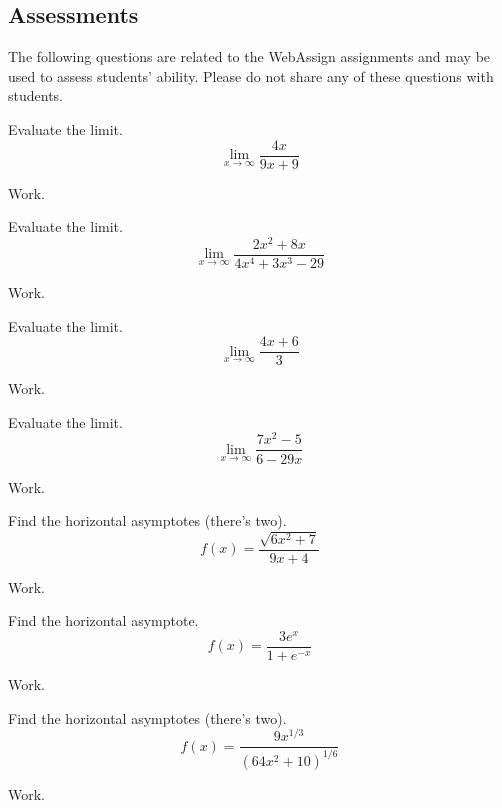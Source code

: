 \documentclass[12pt,addpoints, answers, fleqn]{exam}
\begin{document}
\begin{teacher}
\subsection{Assessments}
The following questions are related to the WebAssign assignments and may be used to assess students' ability. Please do not share any of these questions with students.
\begin{questions}		
\question 	%

Evaluate the limit.
\[
\lim_{x \to \infty} \frac{4x}{9x+9}
\]
\begin{solution}
Work.
\end{solution}


\question 	%

Evaluate the limit.
\[
\lim_{x \to \infty} \frac{2x^2+8x}{4x^4+3x^3-29}
\]
\begin{solution}
Work.
\end{solution}

\question 	%

Evaluate the limit.
\[
\lim_{x \to \infty} \frac{4x+6}{3}
\]
\begin{solution}
Work.
\end{solution}

\question 	%

Evaluate the limit.
\[
\lim_{x \to \infty} \frac{7x^2-5}{6-29x}
\]
\begin{solution}
Work.
\end{solution}

\question 	%

Find the horizontal asymptotes (there's two).
\[
f\left(x\right) = \frac{\sqrt{6x^2 + 7}}{9x+4} 
\]
\begin{solution}
Work.
\end{solution}


\question 	%

Find the horizontal asymptote.
\[
f\left(x\right) = \frac{3e^x}{1 + e^{-x}}
\]
\begin{solution}
Work.
\end{solution}

\question 	%

Find the horizontal asymptotes (there's two).
\[
f\left(x\right) = \frac{9x^{1/3}}{\left(64x^2+10\right)^{1/6}} 
\]
\begin{solution}
Work.
\end{solution}


\end{questions}
\end{teacher}
\end{document}
